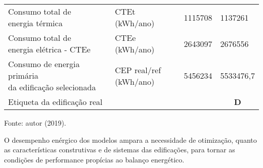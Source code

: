 \begin{table}[H]
\begin{tabular}{llll}
    \makecell[l]{Consumo total de \\energia térmica}                      & CTEt (kWh/ano)         & 1115708              & 1137261                        \\
    \makecell[l]{Consumo total de \\energia elétrica - CTEe}              & CTEe (kWh/ano)         & 2643097              & 2676556                        \\
    \makecell[l]{Consumo de energia primária \\da edificação selecionada} & \makecell[l]{CEP real/ref \\(kWh/ano)} & 5456234              & 5533476,7                      \\ \hline
    \multicolumn{3}{l}{Etiqueta da edificação real}                                                       & \multicolumn{1}{c}{\textbf{D}} \\ \hline
    \end{tabular}
    \begin{flushleft}
        \par \small \vspace{0.1cm} Fonte: autor (2019).
    \end{flushleft}
    \label{tab:tabela15}
\end{table}
\noindent O desempenho enérgico dos modelos ampara a necessidade de otimização, quanto as características construtivas e de sistemas das edificações, para tornar as condições de performance propícias ao balanço energético.